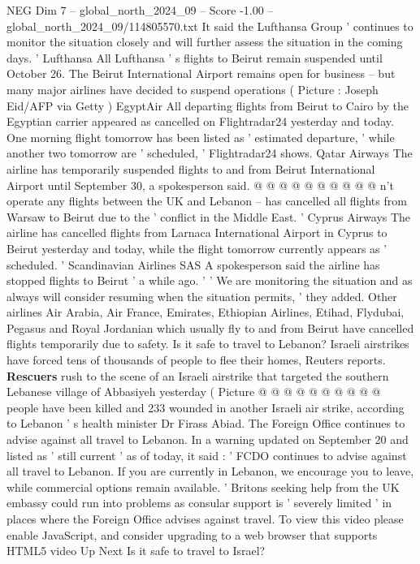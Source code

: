 \begin{textsample}{NEG Dim 7 – global\_north\_2024\_09 – Score -1.00 – global\_north\_2024\_09/114805570.txt}
It said the Lufthansa Group ' continues to monitor the situation closely and will further assess the situation in the coming days. ' Lufthansa All Lufthansa ' s flights to Beirut remain suspended until October 26.
The Beirut International Airport remains open for business -- but many major airlines have decided to suspend operations ( Picture : Joseph Eid/AFP via Getty ) EgyptAir All departing flights from Beirut to Cairo by the Egyptian carrier appeared as cancelled on Flightradar24 yesterday and today.
One morning flight tomorrow has been listed as ' estimated departure, ' while another two tomorrow are ' scheduled, ' Flightradar24 shows.
Qatar Airways The airline has temporarily suspended flights to and from Beirut International Airport until September 30, a spokesperson said. @ @ @ @ @ @ @ @ @ @ n't operate any flights between the UK and Lebanon -- has cancelled all flights from Warsaw to Beirut due to the ' conflict in the Middle East. ' Cyprus Airways The airline has cancelled flights from Larnaca International Airport in Cyprus to Beirut yesterday and today, while the flight tomorrow currently appears as ' scheduled. ' Scandinavian Airlines SAS A spokesperson said the airline has stopped flights to Beirut ' a while ago. ' ' We are monitoring the situation and as always will consider resuming when the situation permits, ' they added.
Other airlines Air Arabia, Air France, Emirates, Ethiopian Airlines, Etihad, Flydubai, Pegasus and Royal Jordanian which usually fly to and from Beirut have cancelled flights temporarily due to safety.
Is it safe to travel to Lebanon?
Israeli airstrikes have forced tens of thousands of people to flee their homes, Reuters reports. \textbf{Rescuers} rush to the scene of an Israeli airstrike that targeted the southern Lebanese village of Abbasiyeh yesterday ( Picture @ @ @ @ @ @ @ @ @ @ people have been killed and 233 wounded in another Israeli air strike, according to Lebanon ' s health minister Dr Firass Abiad.
The Foreign Office continues to advise against all travel to Lebanon.
In a warning updated on September 20 and listed as ' still current ' as of today, it said : ' FCDO continues to advise against all travel to Lebanon.
If you are currently in Lebanon, we encourage you to leave, while commercial options remain available. ' Britons seeking help from the UK embassy could run into problems as consular support is ' severely limited ' in places where the Foreign Office advises against travel.
To view this video please enable JavaScript, and consider upgrading to a web browser that supports HTML5 video Up Next Is it safe to travel to Israel?

\end{textsample}
